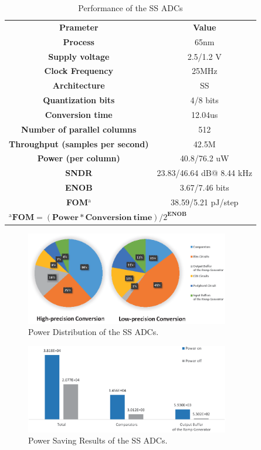 \begin{table}[htbp]
	\caption{Performance of the SS ADCs}
	\begin{center}
		\begin{tabular}{|c|c|}
			\hline
			\textbf{Prameter}& \textbf{Value} \\
			\hhline{|==|}
			\textbf{Process}& 65nm \\
			\hline 
			\textbf{Supply voltage}& 2.5/1.2 V \\
			\hline
			\textbf{Clock Frequency}&	25MHz \\
			\hline
			\textbf{Architecture}&	SS \\
			\hline
			\textbf{Quantization bits}&	4/8 bits\\
			\hline
			\textbf{Conversion time}&	12.04us \\
			\hline
			\textbf{Number of parallel columns}&	512 \\
			\hline
			\textbf{Throughput (samples per second)}&	42.5M \\ 
			\hline
			\textbf{Power (per column)}&	40.8/76.2 uW \\
			\hline
			\textbf{SNDR}& 23.83/46.64 dB@ 8.44 kHz\\
			\hline
			\textbf{ENOB}& 3.67/7.46 bits\\
			\hline
			\textbf{FOM$^{\mathrm{a}}$}& 38.59/5.21 pJ/step\\
			\hline
			\multicolumn{2}{l}{$^{\mathrm{a}}\textbf{FOM}=(\textbf{Power}\ast \textbf{Conversion}\ \textbf{time})/2^{\textbf{ENOB}}$ }	    
		\end{tabular}
		\label{tab1}
	\end{center}
\end{table}

\begin{figure}[htbp]
	\centerline{\includegraphics[width=3.5in]{./Figures/SSResults1.eps}}
	\caption{Power Distribution of the SS ADCs.}
	\label{SSresults1}
\end{figure}

\begin{figure}[htbp]
	\centerline{\includegraphics[width=3.5in]{./Figures/SSResults2.eps}}
	\caption{Power Saving Results of the SS ADCs.}
	\label{SSresults2}
\end{figure} 


